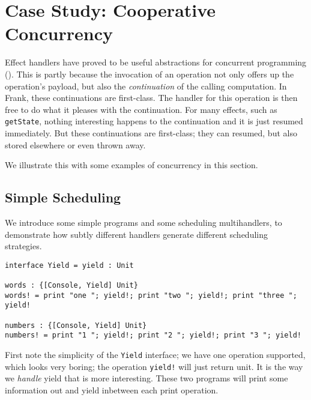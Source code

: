 \documentclass[msc,deptreport,cs]{infthesis} %
\newcommand{\code}[1]{\lstinline{#1}}
\newcommand{\todo}[1]
           {{\par\noindent\small\color{RoyalPurple}
  \framebox{\parbox{\dimexpr\linewidth-2\fboxsep-2\fboxrule}
    {\textbf{TODO:} #1}}}}
\begin{document}
\section{Case Study: Cooperative Concurrency}
\label{sec:concurrency}


Effect handlers have proved to be useful abstractions for concurrent programming
(\cite{dolan2015effective, dolan2017concurrent, hillerstrom2016compilation}).
This is partly because the invocation of an operation not only offers up the
operation's payload, but also the \emph{continuation} of the calling
computation. In Frank, these continuations are first-class. The handler for this
operation is then free to do what it pleases with the continuation. For many
effects, such as \code{getState}, nothing interesting happens to the
continuation and it is just resumed immediately. But these continuations are
first-class; they can resumed, but also stored elsewhere or even thrown away.

We illustrate this with some examples of concurrency in this section.

%

\subsection{Simple Scheduling}
\label{subsec:simple-scheduling}

We introduce some simple programs and some scheduling multihandlers, to
demonstrate how subtly different handlers generate different scheduling
strategies.

\begin{lstlisting}
interface Yield = yield : Unit

words : {[Console, Yield] Unit}
words! = print "one "; yield!; print "two "; yield!; print "three "; yield!

numbers : {[Console, Yield] Unit}
numbers! = print "1 "; yield!; print "2 "; yield!; print "3 "; yield!
\end{lstlisting}

First note the simplicity of the \code{Yield} interface; we have one operation
supported, which looks very boring; the operation \code{yield!} will just return
unit. It is the way we \emph{handle} yield that is more interesting. These two
programs will print some information out and yield inbetween each print
operation.
\end{document}
